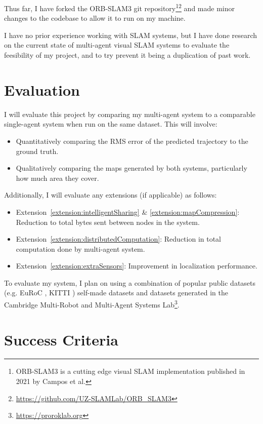 \documentclass[12pt,a4paper,twoside]{article}
\begin{document}
Thus far, I have forked the ORB-SLAM3 git repository\footnote{ORB-SLAM3 is a cutting edge visual SLAM implementation published in 2021 by Campos et al.}\footnote{\url{https://github.com/UZ-SLAMLab/ORB_SLAM3}} \cite{ORBSLAM3_TRO} and made minor changes to the codebase to allow it to run on my machine.

I have no prior experience working with SLAM systems, but I have done research on the current state of multi-agent visual SLAM systems to evaluate the feesibility of my project, and to try prevent it being a duplication of past work.

\section{Evaluation}
\label{sec:Evaluation}
I will evaluate this project by comparing my multi-agent system to a comparable single-agent system when run on the same dataset. This will involve:
\begin{itemize}
  \item Quantitatively comparing the RMS error of the predicted trajectory to the ground truth.
  \item Qualitatively comparing the maps generated by both systems, particularly how much area they cover.
\end{itemize}

Additionally, I will evaluate any extensions (if applicable) as follows:
\begin{itemize}
  \item Extension~\ref{extension:intelligentSharing} \& \ref{extension:mapCompression}: Reduction to total bytes sent between nodes in the system.
  \item Extension~\ref{extension:distributedComputation}: Reduction in total computation done by multi-agent system.
  \item Extension~\ref{extension:extraSensors}: Improvement in localization performance.
\end{itemize}

To evaluate my system, I plan on using a combination of popular public datasets (e.g. EuRoC \autocite{doi:10.1177/0278364915620033}, KITTI \autocite{doi:10.1177/0278364913491297}) self-made datasets and datasets generated in the Cambridge Multi-Robot and Multi-Agent Systems Lab\footnote{\url{https://proroklab.org}}.

\section{Success Criteria}
\end{document}
